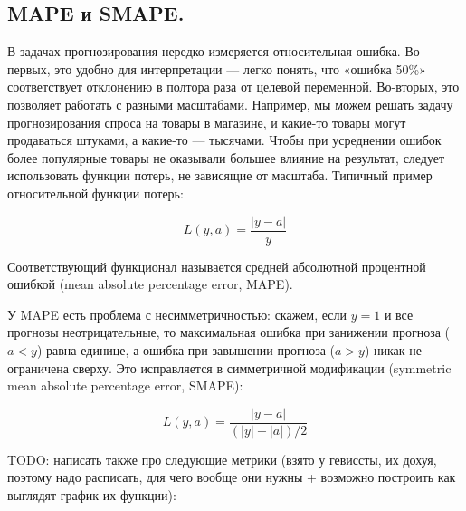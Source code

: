 \subsection*{MAPE и SMAPE.}
В задачах прогнозирования нередко измеряется
относительная ошибка. Во-первых, это удобно для интерпретации — легко
понять, что «ошибка 50\%» соответствует отклонению в полтора раза от
целевой переменной. Во-вторых, это позволяет работать с разными
масштабами. Например, мы можем решать задачу прогнозирования спроса
на товары в магазине, и какие-то товары могут продаваться штуками, а
какие-то — тысячами. Чтобы при усреднении ошибок более популярные
товары не оказывали большее влияние на результат, следует
использовать функции потерь, не зависящие от масштаба. Типичный
пример относительной функции потерь:

\[
  L(y, a) = \frac{|y - a|}{y}
\]

Соответствующий функционал называется средней абсолютной процентной
ошибкой (mean absolute percentage error, MAPE).

У MAPE есть проблема с несимметричностью: скажем, если $y = 1$ и все
прогнозы неотрицательные, то максимальная ошибка при занижении
прогноза ($a < y$) равна единице, а ошибка при завышении прогноза ($a
> y$) никак не ограничена сверху. Это исправляется в симметричной
модификации (symmetric mean absolute percentage error, SMAPE):

\[
  L(y, a) = \frac{|y - a|}{(|y| + |a|)/2}
\]

TODO: написать также про следующие метрики (взято у гевиссты, их
  дохуя, поэтому надо расписать, для чего вообще они нужны + возможно
построить как выглядят график их функции):

